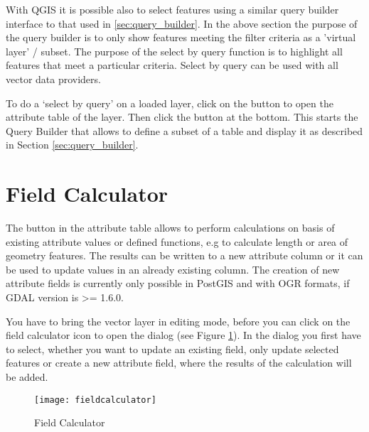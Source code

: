 \label{sec:select_by_query}

With QGIS it is possible also to select features using a similar query builder 
interface to that used in \ref{sec:query_builder}. In the above section 
the purpose of the query builder is to only show features meeting the 
filter criteria as a 'virtual layer' / subset. The purpose of the select by 
query function is to highlight all features that meet a particular criteria. 
Select by query can be used with all vector data providers.

To do a `select by query' on a loaded layer, click on the 
button  to open the attribute table of the layer. Then 
click the  button at the bottom. This starts the Query Builder 
that allows to define a subset of a table and display it as described in Section 
\ref{sec:query_builder}.

\section{Field Calculator}\label{sec:field_calculator}

The  button in the 
attribute table allows to perform calculations on basis of existing 
attribute values or defined functions, e.g to calculate length or area 
of geometry features. The results can be written to a new attribute column 
or it can be used to update values in an already existing column. The creation 
of new attribute fields is currently only possible in PostGIS and with OGR 
formats, if GDAL version is >= 1.6.0. 

You have to bring the vector layer in editing mode, before you can click on 
the field calculator icon to open the dialog (see Figure 
\ref{fig:field_calculator}). In the dialog you first have to select, whether 
you want to update an existing field, only update selected features or 
create a new attribute field, where the results of the calculation will be added. 

\begin{figure}[ht]
  \begin{center}
    \caption{Field Calculator \nixcaption}\label{fig:field_calculator}\smallskip
    \texttt{[image: fieldcalculator]}
  \end{center}
\end{figure}

